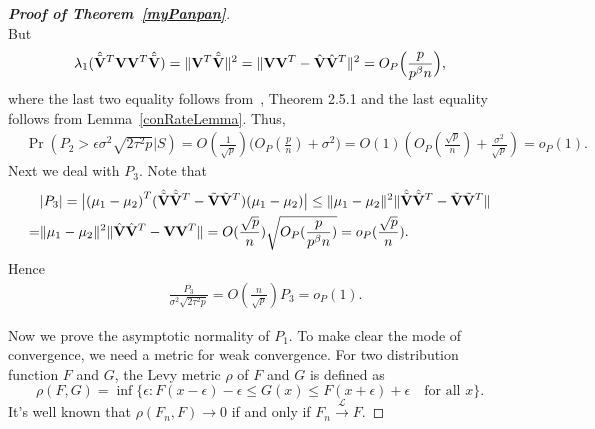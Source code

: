 \documentclass[review]{elsarticle}
\theoremstyle{plain}
\theoremstyle{definition}
\theoremstyle{remark}
\begin{document}
\begin{proof}[\textbf{Proof of Theorem~\ref{myPanpan}}]
\begin{equation*}
    \end{equation*}
    But
    \begin{equation*}
        \begin{aligned}
\lambda_1(\hat{\tilde{\mathbf{V}}}^T \mathbf{V}\mathbf{V}^T  \hat{\tilde{\mathbf{V}}})
=\|\mathbf{V}^T  \hat{\tilde{\mathbf{V}}}\|^2
            = \|\mathbf{V}\mathbf{V}^T-\hat{\mathbf{V}}\hat{\mathbf{V}}^T\|^2=O_P\Big(\frac{p}{p^{\beta}n}\Big),
        \end{aligned}
    \end{equation*}
    where the last two equality follows from~\cite{matrixComputations}, Theorem 2.5.1 and the last equality follows from Lemma~\ref{conRateLemma}. 
    Thus,
    \begin{equation*}
        \begin{aligned}
            &\Pr({P_2}>\epsilon{\sigma^2\sqrt{2\tau^2 p}}\big|S)
             =
             O(\frac{1}{\sqrt{p}})
             \big(O_P(\frac{p}{n})+\sigma^2\big)
             =O(1)(O_P(\frac{\sqrt{p}}{n})+\frac{\sigma^2}{\sqrt{p}})
             =o_P(1).
        \end{aligned}
    \end{equation*}
    Next we deal with $P_3$.
    Note that
    \begin{equation*}
        \begin{aligned}
            &|P_3|=
            \big|{(\mu_1-\mu_2)}^T(\hat{\tilde{\mathbf{V}}}\hat{\tilde{\mathbf{V}}}^T-\tilde{\mathbf{V}}\tilde{\mathbf{V}}^T)(\mu_1-\mu_2)\big|
            \leq 
            \|\mu_1-\mu_2\|^2 \|\hat{\tilde{\mathbf{V}}}\hat{\tilde{\mathbf{V}}}^T-\tilde{\mathbf{V}}\tilde{\mathbf{V}}^T\|\\
            =& 
            \|\mu_1-\mu_2\|^2  \|\hat{\mathbf{V}}\hat{\mathbf{V}}^T-\mathbf{V}\mathbf{V}^T\|
        =O(\frac{\sqrt{p}}{n})\sqrt{O_P(\frac{p}{p^{\beta}n})}=o_P(\frac{\sqrt{p}}{n}).
        \end{aligned}
    \end{equation*}
    Hence
    \begin{equation*}
        \begin{aligned}
            &\frac{P_3}{\sigma^2\sqrt{2\tau^2 p}}= O(\frac{n}{\sqrt{p}})P_3=o_P(1).
        \end{aligned}
    \end{equation*}

    Now we prove the asymptotic normality of $P_1$.
    To make clear the mode of convergence, we need a metric for weak convergence. For two distribution function $F$ and $G$, the Levy metric $\rho$ of $F$ and $G$ is defined as
    $$
   \rho(F,G) =\inf\{\epsilon:F(x-\epsilon)-\epsilon\leq G(x)\leq F(x+\epsilon)+\epsilon\quad \textrm{for all $x$}\}.
    $$
    It's well known that $\rho(F_n,F)\to 0$ if and only if $F_n\xrightarrow{\mathcal{L}}F$.


\end{proof}
\end{document}
